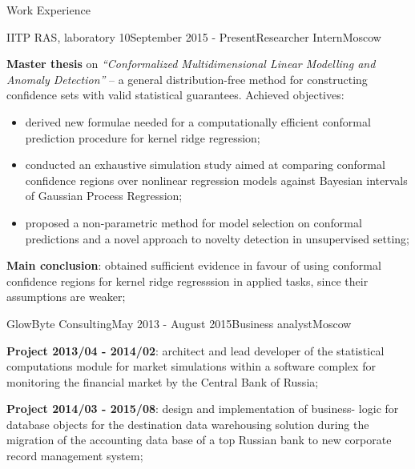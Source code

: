 \documentclass{resume} %
\begin{document}
\begin{rSection}{Work Experience}
\begin{rSubsection}{IITP RAS, laboratory 10}{September 2015 - Present}{Researcher Intern}{Moscow}
\begin{itemize}
    \end{itemize} \medskip
    \item \textbf{Master thesis} on \textit{``Conformalized Multidimensional Linear
    Modelling and Anomaly Detection''} -- a general distribution-free method for
    constructing confidence sets with valid statistical guarantees. Achieved objectives:
    \begin{itemize}
        \item derived new formulae needed for a computationally efficient conformal
        prediction procedure for kernel ridge regression;
        \item conducted an exhaustive simulation study aimed at comparing conformal
        confidence regions over nonlinear regression models against Bayesian intervals
        of Gaussian Process Regression;
        \item proposed a non-parametric method for model selection on conformal predictions
        and a novel approach to novelty detection in unsupervised setting;
    \end{itemize}
    \textbf{Main conclusion}: obtained sufficient evidence in favour of using conformal
    confidence regions for kernel ridge regresssion in applied tasks, since their
    assumptions are weaker; \medskip
\end{rSubsection} \medskip


\begin{rSubsection}{GlowByte Consulting}{May 2013 - August 2015}{Business analyst}{Moscow}
    \item \textbf{Project 2013/04 - 2014/02}: architect and lead developer of the
    statistical computations module for market simulations within a software complex
    for monitoring the financial market by the Central Bank of Russia;
    \item \textbf{Project 2014/03 - 2015/08}: design and implementation of business-
    logic for database objects for the destination data warehousing solution during
    the migration of the accounting data base of a top Russian bank to new corporate
    record management system;
\end{rSubsection} \medskip



\end{rSection}
\end{document}
